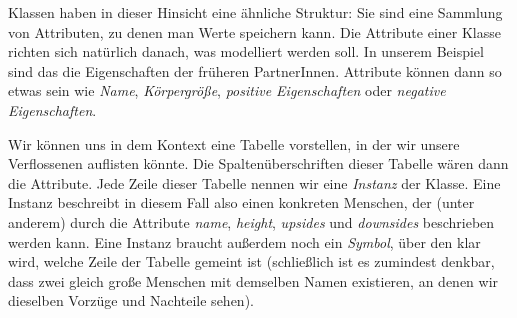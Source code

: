 Klassen haben in dieser Hinsicht eine ähnliche Struktur: Sie sind eine Sammlung von Attributen, zu denen man Werte speichern kann. Die Attribute einer Klasse richten sich natürlich danach, was modelliert werden soll. In unserem Beispiel sind das die Eigenschaften der früheren PartnerInnen. Attribute können dann so etwas sein wie \emph{Name}, \emph{Körpergröße}, \emph{positive Eigenschaften} oder \emph{negative Eigenschaften}.

Wir können uns in dem Kontext eine Tabelle vorstellen, in der wir unsere Verflossenen auflisten könnte. Die Spaltenüberschriften dieser Tabelle wären dann die Attribute. Jede Zeile dieser Tabelle nennen wir eine \emph{Instanz} der Klasse. Eine Instanz beschreibt in diesem Fall also einen konkreten Menschen, der (unter anderem) durch die Attribute \emph{name}, \emph{height}, \emph{upsides} und \emph{downsides} beschrieben werden kann. Eine Instanz braucht außerdem noch ein \emph{Symbol}, über den klar wird, welche Zeile der Tabelle gemeint ist (schließlich ist es zumindest denkbar, dass zwei gleich große Menschen mit demselben Namen existieren, an denen wir dieselben Vorzüge und Nachteile sehen).

